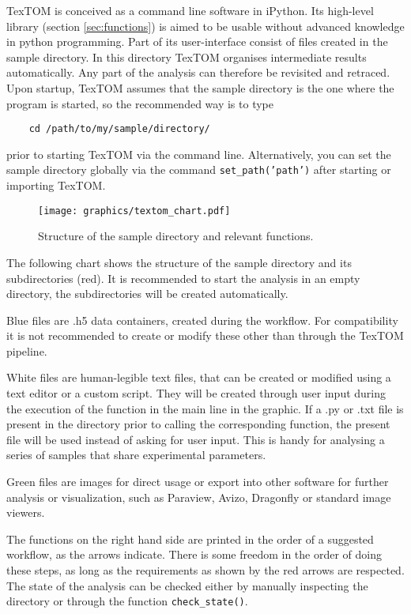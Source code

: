 TexTOM is conceived as a command line software in iPython.
Its high-level library (section \ref{sec:functions}) is aimed to be usable without
advanced knowledge in python programming.
Part of its user-interface consist of files created in the sample directory. In this directory
TexTOM organises intermediate results automatically. Any part of the analysis can therefore be
revisited and retraced.
Upon startup, TexTOM assumes that the sample directory is the one where the program is started,
so the recommended way is to type
\begin{verbatim}
    cd /path/to/my/sample/directory/
\end{verbatim}
prior to starting TexTOM via the command line.
Alternatively, you can set the sample directory globally via the command \texttt{set\_path('path')} 
after starting or importing TexTOM.

\begin{figure}[h!]
    \texttt{[image: graphics/textom\_chart.pdf]}
    \centering
    \caption{Structure of the sample directory and relevant functions.}
\end{figure}
The following chart shows the structure of the sample directory and its subdirectories (red).
It is recommended to start the analysis in an empty directory, the subdirectories will be
created automatically.

Blue files are .h5 data containers, created during the workflow. For compatibility it is not
recommended to create or modify these other than through the TexTOM pipeline.

White files are human-legible text files, that can be created or modified using a text editor or
a custom script. They will be created through user input during the execution of the function
in the main line in the graphic. 
If a .py or .txt file is present in the directory prior to calling the corresponding function,
the present file will be used instead of asking for user input. This is handy for analysing
a series of samples that share experimental parameters.

Green files are images for direct usage or export into other software for further analysis or visualization,
such as Paraview, Avizo, Dragonfly or standard image viewers.

The functions on the right hand side are printed in the order of a suggested workflow, as the arrows indicate.
There is some freedom in the order of doing these steps, as long as the requirements as shown
by the red arrows are respected. The state of the analysis can be checked either by
manually inspecting the directory or through the function \texttt{check\_state()}.

